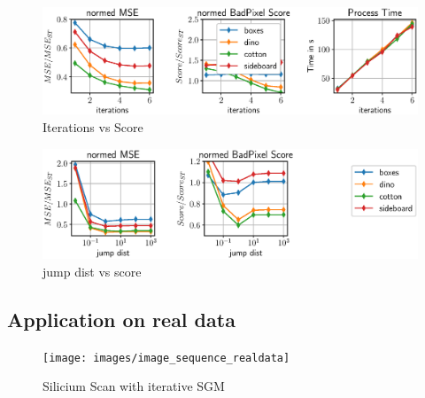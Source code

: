 \documentclass  [
  paper    = a4,
  BCOR     = 10mm,
  twoside,
  fontsize = 12pt,
  fleqn,
  toc      = bibnumbered,
  toc      = listofnumbered,
  numbers  = noendperiod,
  headings = normal,
  listof   = leveldown,
  version  = 3.03
]                                       {scrreprt}
\begin{document}
\begin{figure}
	\centering
	\includegraphics[width=0.7\linewidth]{images/choose_lower_sgm_ppr_merge_iterations}
	\caption[Iterations vs Score]{Iterations vs Score}
	\label{fig:chooselowersgmpprmergeiterations}
\end{figure}

\begin{figure}
	\centering
	\includegraphics[width=0.7\linewidth]{images/choose_lower_sgm_ppr_merge_iterations_exp_penalty1}
	\caption[jump dist vs score]{jump dist vs score}
	\label{fig:chooselowersgmpprmergeiterationsexppenalty1}
\end{figure}


\subsection{Application on real data}

\begin{figure}
	\centering
	\texttt{[image: images/image\_sequence\_realdata]}
	\caption[Silicium Scan]{Silicium Scan with iterative SGM}
	\label{fig:imagesequencerealdata}
\end{figure}
\end{document}
